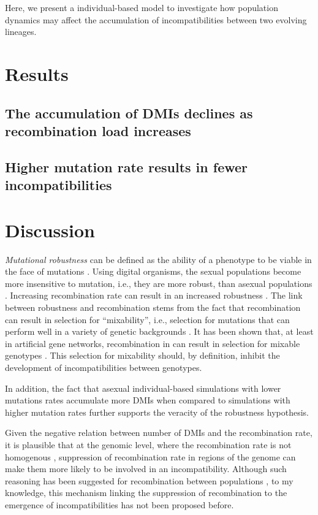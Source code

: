 \documentclass[10pt,letterpaper]{article}
\begin{document}
Here, we present a individual-based model to investigate how population dynamics may affect the accumulation of incompatibilities between two evolving lineages.

\section*{Results}

\subsection*{The accumulation of DMIs declines as recombination load increases} 

\subsection*{Higher mutation rate results in fewer incompatibilities}

\section*{Discussion}
\emph{Mutational robustness} can be defined as the ability of a phenotype to be viable in the face of mutations \cite{Gardner2006}. Using digital organisms, the sexual populations become more insensitive to mutation, i.e., they are more robust, than asexual populations \cite{Misevic2006}. Increasing recombination rate can result in an increased robustness \cite{Gardner2006}. The link between robustness and recombination stems from the fact that recombination can result in selection for ``mixability'', i.e., selection for mutations that can perform well in a variety of genetic backgrounds \cite{Livnat2008, Azevedo2006}. It has been shown that, at least in artificial gene networks, recombination in can result in selection for mixable genotypes \cite{Lohaus2010}. This selection for mixability should, by definition, inhibit the development of incompatibilities between genotypes. 

In addition, the fact that asexual individual-based simulations with lower mutations rates accumulate more DMIs when compared to simulations with higher mutation rates further supports the veracity of the robustness hypothesis. 

Given the negative relation between number of DMIs and the recombination rate, it is plausible that at the genomic level, where the recombination rate is not homogenous \cite{Myers2005}, suppression of recombination rate in regions of the genome can make them more likely to be involved in an incompatibility. Although such reasoning has been suggested for recombination between populations \cite{Nosil2012}, to my knowledge, this mechanism linking the suppression of recombination to the emergence of incompatibilities has not been proposed before.
\end{document}
